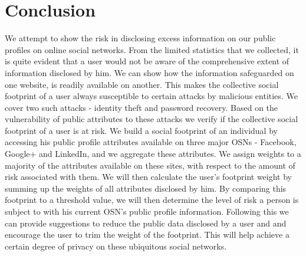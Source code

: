 \documentclass[10pt,conference]{IEEEtran}
\begin{document}
\section{Conclusion}
We attempt to show the risk in disclosing excess information on our public profiles on online social networks. From the limited statistics that we collected, it is quite evident that a user would not be aware of the comprehensive extent of information disclosed by him. We can show how the information safeguarded on one website, is readily available on another. This makes the collective social footprint of a user always susceptible to certain attacks by malicious entities. We cover two such attacks - identity theft and password recovery. Based on the vulnerability of public attributes to these attacks we verify if the collective social footprint of a user is at risk. We build a social footprint of an individual by accessing his public profile attributes available on three major OSNs - Facebook, Google+ and LinkedIn, and we aggregate these attributes. We assign weights to a majority of the attributes available on these sites, with respect to the amount of risk associated with them. We will then calculate the user's footprint weight by summing up the weights of all attributes disclosed by him. By comparing this footprint to a threshold value, we will then determine the level of risk a person is subject to with his current OSN's public profile information. Following this we can provide suggestions to reduce the public data disclosed by a user and and encourage the user to trim the weight of the footprint. This will help achieve a certain degree of privacy on these ubiquitous social networks.

\end{document}
